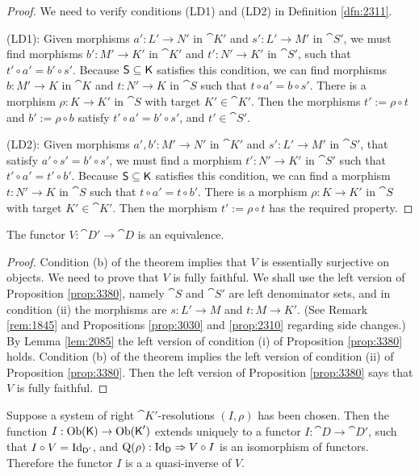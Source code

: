 \begin{proof}
We need to verify conditions (LD1) and (LD2) in Definition \ref{dfn:2311}.

\medskip \noindent
(LD1): Given morphisms $a' : L' \to N'$ in $\cat{K}'$ and 
$s' : L' \to M'$ in $\cat{S}'$, we must find 
morphisms $b' : M' \to K'$ in $\cat{K}'$ and 
$t' : N' \to K'$ in $\cat{S}'$, such that $t' \circ a' = b' \circ s'$.
Because $\operatorname{\mathsf{S}} \subseteq \operatorname{\mathsf{K}}$ satisfies this condition, we can find 
morphisms $b : M' \to K$ in $\cat{K}$ and $t : N' \to K$ in $\cat{S}$
such that $t \circ a' = b \circ s'$. There is a morphism $\rho : K \to K'$ in 
$\cat{S}$ with target $K' \in \cat{K}'$. Then the morphisms $t' := \rho \circ 
t$ 
and $b' := \rho \circ b$ satisfy $t' \circ a' = b' \circ s'$, and 
$t' \in \cat{S}'$.

\medskip \noindent
(LD2): Given morphisms $a', b' : M' \to N'$ in $\cat{K}'$ and 
$s' : L' \to M'$ in $\cat{S}'$, that satisfy 
$a' \circ s' = b' \circ s'$, we must find 
a morphism $t' : N' \to K'$ in $\cat{S}'$ such that 
$t' \circ a' = t' \circ  b'$.
Because $\operatorname{\mathsf{S}} \subseteq \operatorname{\mathsf{K}}$ satisfies this condition, we can find 
a morphism $t : N' \to K$ in $\cat{S}$ such that 
$t \circ a' = t \circ  b'$.
There is a morphism $\rho : K \to K'$ in $\cat{S}$ with target 
$K' \in \cat{K}'$. Then the morphism $t' := \rho \circ t$ has the required 
property. 
\end{proof}

\begin{lem} \label{lem:2086}
The functor $V : \cat{D}' \to \cat{D}$ is an equivalence. 
\end{lem}

\begin{proof}
Condition (b) of the theorem implies that $V$ is essentially surjective on 
objects. We need to prove that $V$ is fully faithful. 
We shall use the left version of Proposition \ref{prop:3380}, namely $\cat{S}$ 
and $\cat{S}'$ are left denominator sets, and in condition (ii) the morphisms 
are $s : L' \to M$ and $t : M \to K'$. (See Remark \ref{rem:1845} and 
Propositions \ref{prop:3030} and \ref{prop:2310} regarding side changes.)
By Lemma \ref{lem:2085} the left version of condition (i) of 
Proposition \ref{prop:3380} holds. Condition (b) of the theorem implies 
the left version of condition (ii) of Proposition \ref{prop:3380}. 
Then the left version of Proposition \ref{prop:3380} says that 
$V$ is fully faithful. 
\end{proof}

\begin{lem} \label{lem:2081}
Suppose a system  of right $\cat{K}'$-resolutions 
$(I, \rho)$ has been chosen. Then the function 
$I : \operatorname{Ob}(\operatorname{\mathsf{K}}) \to \operatorname{Ob}(\operatorname{\mathsf{K}}')$ extends uniquely to a 
functor $I : \cat{D} \to \cat{D}'$, such that 
$I \circ V = \operatorname{Id}_{\operatorname{\mathsf{D}}'}$, and 
$\operatorname{Q}(\rho) : \operatorname{Id}_{\operatorname{\mathsf{D}}} \Rightarrow V \circ I$
is an isomorphism of functors.
Therefore the functor $I$ is a a quasi-inverse of $V$. 
\end{lem}

